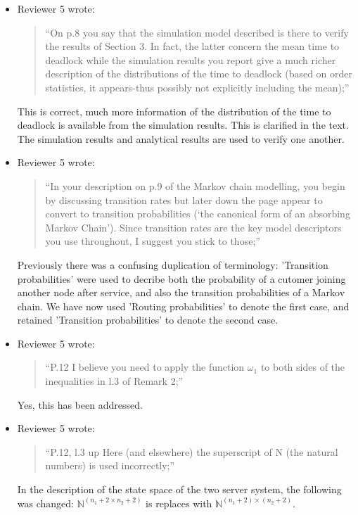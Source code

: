 \documentclass{article}
\begin{document}
\begin{itemize}
\item Reviewer 5 wrote:
\begin{quote}
``On p.8 you say that the simulation model described is there to verify the
results of Section 3.
In fact, the latter concern the mean time to deadlock while the simulation
results you report give a much richer description of the distributions of the
time to deadlock (based on order statistics, it appears-thus possibly not
explicitly including the mean);''
\end{quote}
This is correct, much more information of the distribution of the time to
deadlock is available from the simulation results.
This is clarified in the text.
The simulation results and analytical results are used to verify one another.

\item Reviewer 5 wrote:
\begin{quote}
``In your description on p.9 of the Markov chain modelling, you begin by
discussing transition rates but later down the page appear to convert to
transition probabilities (‘the canonical form of an absorbing Markov Chain’).
Since transition rates are the key model descriptors you use throughout,
I suggest you stick to those;''
\end{quote}
Previously there was a confusing duplication of terminology: 'Transition
probabilities' were used to decribe both the probability of a cutomer joining
another node after service, and also the transition probabilities of a Markov
chain.
We have now used 'Routing probabilities' to denote the first case, and retained
'Transition probabilities' to denote the second case.


\item Reviewer 5 wrote:
\begin{quote}
``P.12 I believe you need to apply the function $\omega_1$ to both sides of the
inequalities in l.3 of Remark 2;''
\end{quote}
Yes, this has been addressed.

\item Reviewer 5 wrote:
\begin{quote}
``P.12, l.3 up Here (and elsewhere) the superscript of N (the natural numbers)
is used incorrectly;''
\end{quote}
In the description of the state space of the two server system, the following
was changed: $\mathbb{N}^{(n_1+2\times n_2+2)}$ is replaces with
$\mathbb{N}^{(n_1+2)\times (n_2+2)}$.



\end{itemize}
\end{document}
